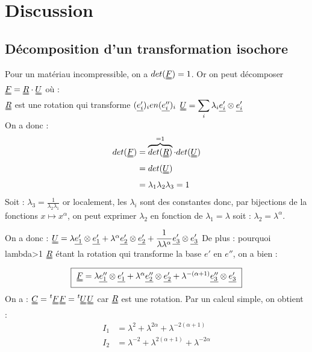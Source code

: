 \documentclass[a4paper,11pt]{article}
\newcommand{\trans}[1]{\tensor[^t]{#1}{}}
\newcommand{\SUM}{\displaystyle\sum}
\newcommand{\FRAC}{\displaystyle\frac}
\newcommand{\tens}{\uuline}
\begin{document}
\section{Discussion}
\subsection{Décomposition d'un transformation isochore}
Pour un matériau incompressible, on a $det(\tens{F}) = 1$.
Or on peut décomposer $\tens{F} = \tens{R}\cdot \tens{U}$ où :\\
$\tens{R}$ est une rotation qui transforme $(\uline{e'_i})_i en (\uline{e''_i})_i$
$\tens{U} = \SUM_i \lambda_i \uline{e'_i} \otimes \uline{e'_i}$
\\
On a donc :
\begin{align*}
det(\tens{F}) &= \overbrace{det(\tens{R})}^{=1} \cdot det(\tens{U}) \\
&= det(\tens{U}) \\
&= \lambda_1 \lambda_2 \lambda_3 = 1\\
\end{align*}
Soit : $\lambda_3 = \FRAC{1}{\lambda_2 \lambda_1}$ or localement, les $\lambda_i$ sont des constantes donc, par bijections de la fonctions $x \mapsto x^\alpha$, on peut exprimer $\lambda_2$ en fonction de $\lambda_1 = \lambda$ soit : $\lambda_2 = \lambda^\alpha$.

On a donc : $\tens{U} = \lambda \uline{e'_1} \otimes \uline{e'_1} + \lambda^\alpha \uline{e'_2} \otimes \uline{e'_2} + \FRAC{1}{\lambda \lambda^\alpha} \uline{e'_3} \otimes \uline{e'_3}$
De plus : pourquoi lambda>1
$\tens{R}$ étant la rotation qui transforme la base $e'$ en $e''$, on a bien :
\begin{equation}
\fbox{
$
\tens{F} = \lambda \uline{e''_1} \otimes \uline{e'_1} + \lambda^\alpha \uline{e''_2} \otimes \uline{e'_2} + \lambda^{-(\alpha +1)} \uline{e''_3} \otimes \uline{e'_3}
$
}
\end{equation}
On a : $\tens{C} = \trans{\tens{F}} \tens{F} = \trans{\tens{U}} \tens{U}$ car $\tens{R}$ est une rotation.
Par un calcul simple, on obtient : 
\begin{align*}
I_1 &= \lambda^2 + \lambda^{2 \alpha} + \lambda^{- 2 (\alpha +1)} \\
I_2 &= \lambda^{-2} + \lambda^{2 (\alpha+1)} + \lambda^{ -2 \alpha} \\
\end{align*}
\end{document}
